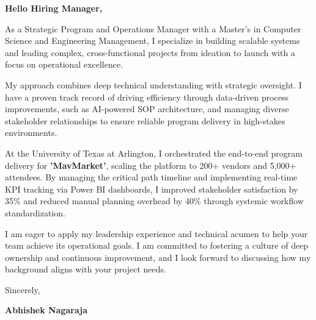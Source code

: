 \documentclass[11pt,letterpaper]{article} %
\begin{document}
\vspace{1.5em}

\textbf{Hello Hiring Manager,}

As a Strategic Program and Operations Manager with a Master's in Computer Science and Engineering Management, I specialize in building scalable systems and leading complex, cross-functional projects from ideation to launch with a focus on operational excellence.

My approach combines deep technical understanding with strategic oversight. I have a proven track record of driving efficiency through data-driven process improvements, such as AI-powered SOP architecture, and managing diverse stakeholder relationships to ensure reliable program delivery in high-stakes environments.

At the University of Texas at Arlington, I orchestrated the end-to-end program delivery for \textbf{'MavMarket'}, scaling the platform to 200+ vendors and 5,000+ attendees. By managing the critical path timeline and implementing real-time KPI tracking via Power BI dashboards, I improved stakeholder satisfaction by 35\% and reduced manual planning overhead by 40\% through systemic workflow standardization.

I am eager to apply my leadership experience and technical acumen to help your team achieve its operational goals. I am committed to fostering a culture of deep ownership and continuous improvement, and I look forward to discussing how my background aligns with your project needs.

\vspace{1.5em}
Sincerely,

\vspace{1.2em} %
\textbf{Abhishek Nagaraja}
\end{document}
